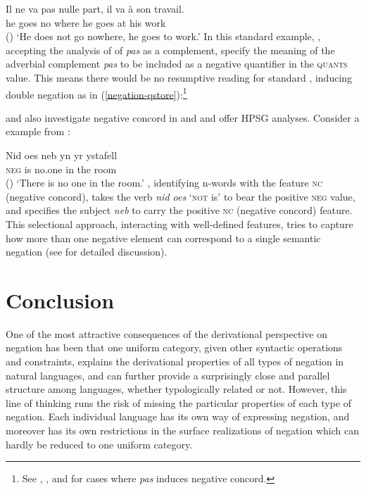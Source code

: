 \documentclass[output=paper
 	        ,biblatex
                ,babelshorthands
                ,newtxmath
                ,draftmode
                ,colorlinks, citecolor=brown
]{langscibook}
\begin{document}
\begin{exe}
\begin{xlist}
\ea
\gll Il ne     va   pas    nulle part, il va   à  son travail.\\
     he \NEG{} goes \NEG{} no    where he goes at his work\\\hfill()
\glt `He does not go nowhere, he goes to work.'
\z
%
In this standard  example, \citet{Swart:02}, accepting
the analysis of \citet{Kim:00} of \textit{pas} as a complement,
specify the meaning of the adverbial complement \emph{pas} to be included as a negative quantifier in the \textsc{quants} value.
 This means there would be no resumptive
reading for standard , inducing double negation as in
(\ref{negation-qstore}):\footnote{See , ,
and  for cases where \textit{pas} induces negative concord.}

\ea
\label{negation-qstore}
\z

\citet{PK:99} and \citet{BJ:00} also  investigate negative concord in  and 
and offer HPSG analyses. Consider a  example from \citet[]{BJ:00}:

\ea
\gll Nid         oes neb yn yr ystafell\\
\textsc{neg}    is no.one in the room\\\hfill()
\glt `There is no one in the room.'
\z
\noindent \citet{BJ:00}, identifying n-words with the feature
\textsc{nc} (negative
concord),  takes the verb \emph{nid oes} `\textsc{not} is' to bear the positive \textsc{neg} value,
and specifies the subject \emph{neb} to carry the positive \textsc{nc} (negative
concord) feature. This selectional approach, interacting with
well-defined features, tries to capture how more than one
negative element can correspond to a single semantic negation (see
\citealt{BJ:00} for detailed discussion).



\section{Conclusion}

One of the most attractive consequences of the derivational perspective on negation has been that
one uniform category, given other syntactic operations and constraints, explains the derivational
properties of all types of negation in natural languages, and can further provide a surprisingly
close and parallel structure among languages, whether typologically related or not. However, this
line of thinking runs the risk of missing the particular properties of each type of negation. Each
individual language has its own way of expressing negation, and moreover has its own restrictions in
the surface realizations of negation which can hardly be reduced to one uniform category.



\end{xlist}
\end{exe}
\end{document}
